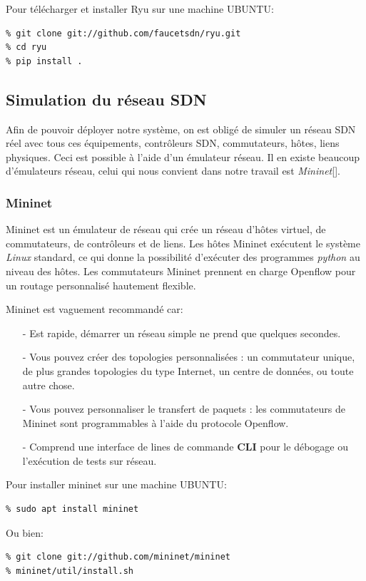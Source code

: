 \noindent Pour télécharger et installer Ryu sur une machine UBUNTU:
\begin{verbatim}
% git clone git://github.com/faucetsdn/ryu.git
% cd ryu
% pip install .
\end{verbatim}


\subsection{Simulation du réseau SDN}
Afin de pouvoir déployer notre système, on est obligé de simuler un réseau SDN réel avec tous ces équipements, contrôleurs SDN, commutateurs, hôtes, liens physiques. Ceci est possible à l'aide d'un émulateur réseau. Il en existe beaucoup d'émulateurs réseau, celui qui nous convient dans notre travail est \textit{Mininet}[\cite{28}].

\subsubsection{Mininet}
Mininet est un émulateur de réseau qui crée un réseau d’hôtes virtuel, de commutateurs, de contrôleurs et de liens. Les hôtes Mininet exécutent le système \textit{Linux} standard, ce qui donne la possibilité d'exécuter des programmes \textit{python} au niveau des hôtes. Les commutateurs Mininet prennent en charge Openflow pour un routage personnalisé hautement flexible.

\noindent Mininet est vaguement recommandé car:\\
\begin{itemize}
\item[-] Est rapide, démarrer un réseau simple ne prend que quelques secondes.\\
\item[-] Vous pouvez créer des topologies personnalisées : un commutateur unique, de plus grandes topologies du type Internet, un centre de données, ou toute autre chose.\\
\item[-] Vous pouvez personnaliser le transfert de paquets : les commutateurs de Mininet sont programmables à l’aide du protocole Openflow.\\
\item[-] Comprend une interface de lines de commande \textbf{CLI} pour le débogage ou l’exécution de tests sur réseau.\\
\end{itemize}

\noindent Pour installer mininet sur une machine UBUNTU:
\begin{verbatim}
% sudo apt install mininet
\end{verbatim}
Ou bien: 
\begin{verbatim}
% git clone git://github.com/mininet/mininet
% mininet/util/install.sh
\end{verbatim}

